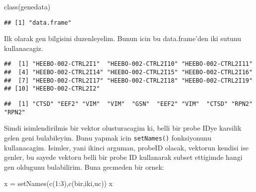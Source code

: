 \documentclass[
]{book}
\newenvironment{Shaded}{\begin{snugshade}}{\end{snugshade}}
\newcommand{\DecValTok}[1]{\textcolor[rgb]{0.00,0.00,0.81}{#1}}
\newcommand{\FunctionTok}[1]{\textcolor[rgb]{0.00,0.00,0.00}{#1}}
\newcommand{\NormalTok}[1]{#1}
\newcommand{\OtherTok}[1]{\textcolor[rgb]{0.56,0.35,0.01}{#1}}
\newcommand{\SpecialCharTok}[1]{\textcolor[rgb]{0.00,0.00,0.00}{#1}}
\newcommand{\StringTok}[1]{\textcolor[rgb]{0.31,0.60,0.02}{#1}}
\begin{document}
\begin{Shaded}
\begin{Highlighting}[]
\FunctionTok{class}\NormalTok{(genedata)}
\end{Highlighting}
\end{Shaded}

\begin{verbatim}
## [1] "data.frame"
\end{verbatim}

Ilk olarak gen bilgisini duzenleyelim. Bunun icin bu data.frame'den iki sutunu kullanacagiz.

\begin{Shaded}
\end{Shaded}

\begin{verbatim}
##  [1] "HEEBO-002-CTRL2I1"  "HEEBO-002-CTRL2I10" "HEEBO-002-CTRL2I11"
##  [4] "HEEBO-002-CTRL2I14" "HEEBO-002-CTRL2I15" "HEEBO-002-CTRL2I16"
##  [7] "HEEBO-002-CTRL2I17" "HEEBO-002-CTRL2I18" "HEEBO-002-CTRL2I19"
## [10] "HEEBO-002-CTRL2I2"
\end{verbatim}

\begin{Shaded}
\end{Shaded}

\begin{verbatim}
##  [1] "CTSD" "EEF2" "VIM"  "VIM"  "GSN"  "EEF2" "VIM"  "CTSD" "RPN2" "RPN2"
\end{verbatim}

Simdi isimlendirilmis bir vektor olusturacagim ki, belli bir probe IDye karsilik gelen geni bulabileyim. Bunu yapmak icin \texttt{setNames()} fonksiyonunu kullanacagim. Isimler, yani ikinci arguman, probeID olacak, vektorun kendisi ise genler, bu sayede vektoru belli bir probe ID kullanarak subset ettigimde hangi gen oldugunu bulabilirim. Buna gecmeden bir ornek:

\begin{Shaded}
\begin{Highlighting}[]
\NormalTok{x }\OtherTok{=} \FunctionTok{setNames}\NormalTok{(}\FunctionTok{c}\NormalTok{(}\DecValTok{1}\SpecialCharTok{:}\DecValTok{3}\NormalTok{),}\FunctionTok{c}\NormalTok{(}\StringTok{\textquotesingle{}bir\textquotesingle{}}\NormalTok{,}\StringTok{\textquotesingle{}iki\textquotesingle{}}\NormalTok{,}\StringTok{\textquotesingle{}uc\textquotesingle{}}\NormalTok{))}
\NormalTok{x}
\end{Highlighting}
\end{Shaded}
\end{document}
